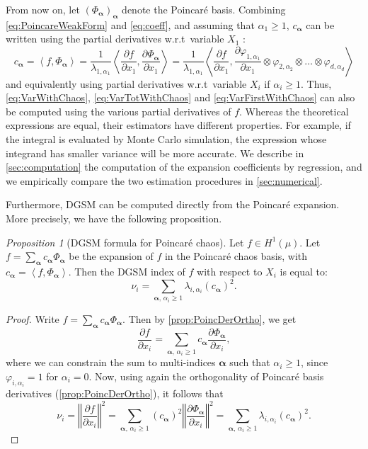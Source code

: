 \documentclass[a4paper,11pt]{article}
\newcommand{\ve}[1]{\boldsymbol{#1}}
\newcommand{\innprod}[2]{\left\langle #1, #2 \right\rangle}
\newcommand{\alp}{{\ve{\alpha}}}
\newcommand{\Phal}{\Phi_{\alp}}
\newcommand{\vpali}[1]{\varphi_{#1, \alpha_{#1}}}
\newcommand{\eig}[1]{\lambda_{#1, \alpha_{#1}}}
\renewcommand{\citep}[2][]{\cite[#1]{#2}}
\theoremstyle{definition}
\theoremstyle{remark}
\theoremstyle{theorem}
\newtheorem{prop}{Proposition}
\begin{document}
From now on, let $(\Phal)_\alp$ denote the Poincar\'e basis. 
Combining \eqref{eq:PoincareWeakForm} and \eqref{eq:coeff}, and assuming that $\alpha_1\geq 1$, $c_\alp$ can be written using the partial derivatives w.r.t\ variable $X_1$ \citep{rougam20}:
\begin{equation} \label{eq:ChaosCoefWithDer}
c_\alp = \innprod{f}{\Phal} 
= \frac{1}{\eig{1}} 
\innprod{\frac{\partial f}{\partial x_1}}
{\frac{\partial \Phal}{\partial x_1}}
= \frac{1}{\eig{1}}  
\innprod{ \frac{\partial f}{\partial x_1}}
{\frac{\partial \vpali{1}}{\partial x_1} \otimes \vpali{2} \otimes \dots \otimes \vpali{d}}
\end{equation}
and equivalently using partial derivatives w.r.t\ variable $X_i$ if $\alpha_i \geq 1$.
Thus, \eqref{eq:VarWithChaos}, \eqref{eq:VarTotWithChaos} and \eqref{eq:VarFirstWithChaos} can also be computed using 
the various partial derivatives of $f$. Whereas the theoretical expressions are equal, their estimators have different properties. 
For example, if the integral is evaluated by Monte Carlo simulation, the expression whose integrand has smaller variance will be more accurate.
We describe in \cref{sec:computation} the computation of the expansion coefficients by regression,
and we empirically compare the two estimation procedures in \cref{sec:numerical}. 



Furthermore,  
DGSM can be computed directly from the Poincar\'e expansion. More precisely, we have the following proposition.
\begin{prop}[DGSM formula for Poincar\'e chaos]
	Let $f \in H^1(\mu)$. 
	Let $f = \sum_{\alp} c_\alp \Phal$ be the expansion of $f$ in the Poincar\'e chaos basis, with ${c_\alp = \innprod{ f}{ \Phal} }$.
	Then the DGSM index of $f$ with respect to $X_i$ is equal to:
	\begin{equation} \label{eq:DGSM_Poincare}
	\nu_i = \sum_{\alp, \, \alpha_i \geq 1} \lambda_{i, \alpha_i} \left(c_\alp \right)^2.
	\end{equation}
\end{prop}

\begin{proof}
	Write $f = \sum_{\alp} c_\alp \Phal$. Then by \cref{prop:PoincDerOrtho}, we get
	\begin{equation*}
	\frac{\partial f}{\partial x_i} = \sum_{\alp, \, \alpha_i \geq 1} c_\alp \frac{\partial \Phal}{\partial x_i},
	\end{equation*}
	where we can constrain the sum to multi-indices $\alp$ such that $\alpha_i \geq 1$, since ${\varphi_{i, \alpha_i} = 1}$ for $\alpha_i = 0$.
	Now, using again the orthogonality of Poincar\'e basis derivatives (\cref{prop:PoincDerOrtho}), it follows that
	\begin{equation*}
	\nu_i = \left\Vert \frac{\partial f}{\partial x_i} \right\Vert ^2
	= \sum_{\alp, \, \alpha_i \geq 1} (c_\alp)^2 \left\Vert \frac{\partial \Phal}{\partial x_i} \right\Vert^2
	= \sum_{\alp, \, \alpha_i \geq 1} \lambda_{i, \alpha_i} \left(c_\alp \right)^2.
	\end{equation*}
	
\end{proof}
\end{document}
